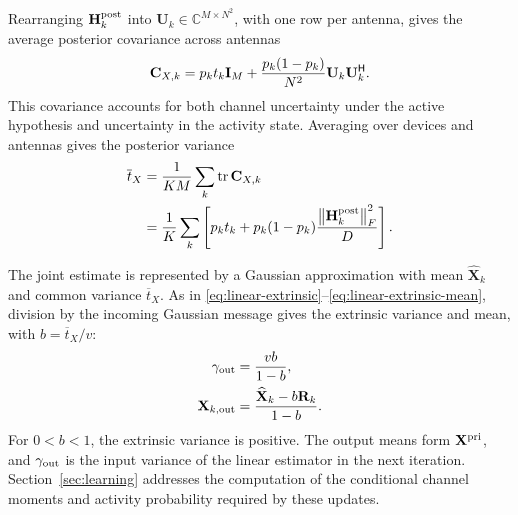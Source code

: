 Rearranging $\mathbf H_k^{\rm post}$ into
$\mathbf U_k\in\mathbb C^{M\times N^2}$, with one row per antenna,
gives the average posterior covariance across antennas
\begin{equation}
 \mathbf C_{X,k}=p_kt_k\mathbf{I}_M+
 \frac{p_k(1-p_k)}{N^2}\mathbf U_k\mathbf U_k^{\mathsf H}.
 \label{eq:joint-spatial-covariance}
\end{equation}
This covariance accounts for both channel uncertainty under the active
hypothesis and uncertainty in the activity state. Averaging over devices
and antennas gives the posterior variance
\begin{equation}
 \begin{aligned}
 \overline t_X&=\frac{1}{KM}\sum_k\operatorname{tr}\mathbf C_{X,k}\\
 &=\frac1K\sum_k\left[
 p_kt_k+p_k(1-p_k)\frac{\left\lVert\mathbf H_k^{\rm post}\right\rVert_F^2}{D}\right].
 \end{aligned}
 \label{eq:joint-average-variance}
\end{equation}

The joint estimate is represented by a Gaussian approximation with mean
$\widehat{\mathbf X}_k$ and common variance $\overline t_X$.
As in \eqref{eq:linear-extrinsic}--\eqref{eq:linear-extrinsic-mean},
division by the incoming Gaussian message gives the extrinsic variance
and mean, with $b=\overline t_X/v$:
\begin{align}
 \gamma_{\rm out}&=\frac{vb}{1-b},
 \label{eq:nonlinear-extrinsic}\\
 \mathbf X_{k,\rm out}&=\frac{\widehat{\mathbf X}_k-b\mathbf R_k}{1-b}.
 \label{eq:nonlinear-extrinsic-mean}
\end{align}
For $0<b<1$, the extrinsic variance is positive.
The output means form $\mathbf X^{\rm pri}$, and $\gamma_{\rm out}$ is the
input variance of the linear estimator in the next iteration.
Section~\ref{sec:learning} addresses the computation of the conditional
channel moments and activity probability required by these updates.
